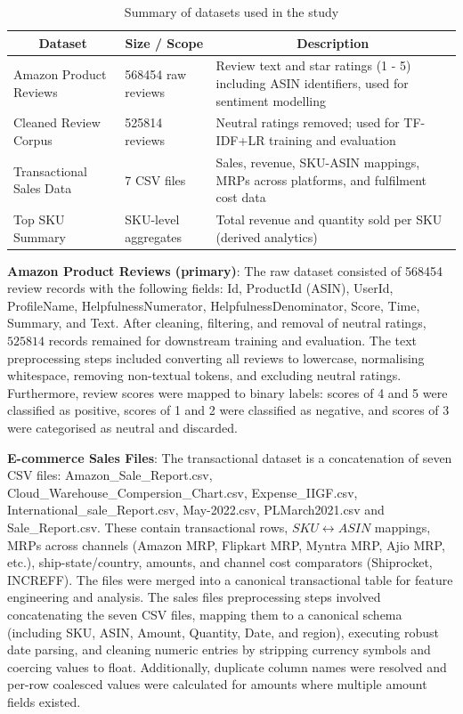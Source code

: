 \documentclass[authoryear,review,3p,times,12pt]{elsarticle}
\begin{document}
\begin{table}
\centering
\caption{Summary of datasets used in the study}
\label{tab:summary_datasets}
\begin{tabular}{p{3cm} p{5cm} p{6cm}}
\hline
\multicolumn{1}{c}{\textbf{Dataset}} & \multicolumn{1}{c}{\textbf{Size   / Scope}} & \multicolumn{1}{c}{\textbf{Description}}       \\ \hline                                
Amazon Product   Reviews & 568454 raw   reviews & Review text and   star ratings (1 - 5) including ASIN identifiers, used for sentiment modelling \\
Cleaned Review   Corpus              & 525814 reviews                              & Neutral ratings   removed; used for TF-IDF+LR training and evaluation                 \\
Transactional   Sales Data           & 7 CSV files                                 & Sales, revenue,   SKU-ASIN mappings, MRPs across platforms, and fulfilment cost data \\
Top SKU Summary                      & SKU-level   aggregates                      & Total revenue   and quantity sold per SKU (derived analytics)   
\\ \hline
\end{tabular}
\end{table}

\textbf{Amazon Product Reviews (primary)}: The raw dataset consisted of 568454 review records with the following fields: Id, ProductId (ASIN), UserId, ProfileName, HelpfulnessNumerator, HelpfulnessDenominator, Score, Time, Summary, and Text. After cleaning, filtering, and removal of neutral ratings, $525814$ records remained for downstream training and evaluation. The text preprocessing steps included converting all reviews to lowercase, normalising whitespace, removing non-textual tokens, and excluding neutral ratings. Furthermore, review scores were mapped to binary labels: scores of 4 and 5 were classified as positive, scores of 1 and 2 were classified as negative, and scores of 3 were categorised as neutral and discarded.

\textbf{E-commerce Sales Files}: The transactional dataset is a concatenation of seven CSV files: Amazon\_Sale\_Report.csv, Cloud\_Warehouse\_Compersion\_Chart.csv, Expense\_IIGF.csv, International\_sale\_Report.csv, May-2022.csv, PLMarch2021.csv and Sale\_Report.csv. These contain transactional rows, $SKU \leftrightarrow ASIN$ mappings, MRPs across channels (Amazon MRP, Flipkart MRP, Myntra MRP, Ajio MRP, etc.), ship-state/country, amounts, and channel cost comparators (Shiprocket, INCREFF). The files were merged into a canonical transactional table for feature engineering and analysis. The sales files preprocessing steps involved concatenating the seven CSV files, mapping them to a canonical schema (including SKU, ASIN, Amount, Quantity, Date, and region), executing robust date parsing, and cleaning numeric entries by stripping currency symbols and coercing values to float. Additionally, duplicate column names were resolved and per-row coalesced values were calculated for amounts where multiple amount fields existed.
\end{document}
